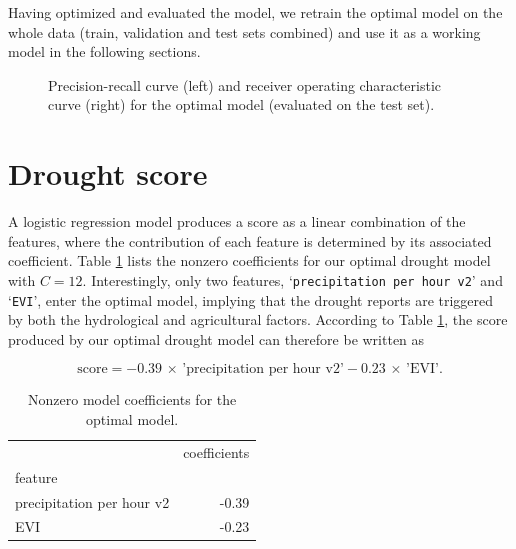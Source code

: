 \documentclass[10pt,parskip=half,
toc=sectionentrywithdots,
bibliography=totocnumbered,
captions=tableheading,numbers=noendperiod]{scrartcl}
\begin{document}
Having optimized and evaluated the model, we retrain the optimal model
on the whole data (train, validation and test sets combined) and use it
as a working model in the following sections.

\begin{figure}[b]\begin{center}\end{center}\caption{Precision-recall curve (left) and receiver operating characteristic
curve (right) for the optimal model (evaluated on the test set).}\label{fig_pr}\end{figure}

\hypertarget{drought-score}{%
\section{Drought score}\label{drought-score}}

A logistic regression model produces a score as a linear combination of
the features, where the contribution of each feature is determined by
its associated coefficient. Table \ref{tab_coefs} lists the nonzero
coefficients for our optimal drought model with \(C=12\). Interestingly,
only two features, `\texttt{precipitation\ per\ hour\ v2}' and
`\texttt{EVI}', enter the optimal model, implying that the drought
reports are triggered by both the hydrological and agricultural factors.
According to Table \ref{tab_coefs}, the score produced by our optimal
drought model can therefore be written as

\begin{equation}\label{eqn_score}
\textrm{score}=-0.39\,\times\,\textrm{'precipitation per hour v2'}-0.23\,\times\,\textrm{'EVI'}.
\end{equation}

\begin{table}[H]
\caption{Nonzero model coefficients for the optimal model.}\label{tab_coefs}
\centering
\begin{adjustbox}{max width=\textwidth}
\begin{tabular}{lr}
\toprule
{} &  coefficients \\
feature                   &               \\
\midrule
precipitation per hour v2 &         -0.39 \\
EVI                       &         -0.23 \\
\bottomrule
\end{tabular}

\end{adjustbox}
\end{table}
\end{document}

